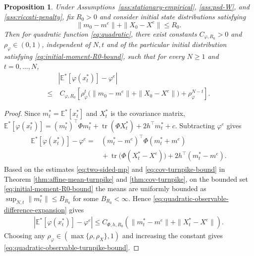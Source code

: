 \documentclass[10pt,journal,twoside]{IEEEtran}
\newtheorem{proposition}{Proposition}
\theoremstyle{definition}
\theoremstyle{remark}
\begin{document}
\begin{proposition}
	\label{prop:quadratic-observable-turnpike}
	Under Assumptions~\ref{ass:stationary-empirical}, \ref{ass:psd-W}, 
	and \ref{ass:riccati-penalty}, fix \(R_0>0\)
	and consider initial state distributions satisfying
	\begin{equation}
		\|m_0-m^e\|+\|X_0-X^e\|\le R_0 .
		\label{eq:initial-moment-R0-bound}
	\end{equation}
	Then for quadratic function \eqref{eq:quadratic}, there exist constants \(C_{\varphi,R_0}>0\)
	 and \(\rho_\varphi\in(0,1)\), independent of \(N,t\) and of
	the particular initial distribution satisfying \eqref{eq:initial-moment-R0-bound},
	such that for every \(N\ge 1\) and \(t=0,\ldots,N\),
	\begin{equation}
		\begin{aligned}
			&\left|
			\mathbb E^*[\varphi(x_t^*)]-\varphi^e
			\right|                                      \\
			\le&~
			C_{\varphi,R_0}
			\left[
			\rho_\varphi^t
			\big(
			\|m_0-m^e\|+\|X_0-X^e\|
			\big)
			+\rho_\varphi^{N-t}
			\right].
		\end{aligned}
		\label{eq:quadratic-observable-turnpike-bound}
	\end{equation}
\end{proposition}

\begin{proof}
	Since \(m_t^*=\mathbb E^*[x_t^*]\) and \(X_t^*\) is the
	covariance matrix,
	$\mathbb E^*[\varphi(x_t^*)]
			=
			(m_t^*)^\top \varPhi m_t^*
			+\operatorname{tr}(\varPhi X_t^*)
			+2h^\top m_t^*+c$.
	Subtracting $\varphi^e$ gives
	\begin{equation}
		\begin{aligned}
			\mathbb E^*[\varphi(x_t^*)]-\varphi^e
			={}&
			(m_t^*-m^e)^\top \varPhi (m_t^*+m^e)\\
			&\!\!\!\!\!\!\!\!\!\!+
			\operatorname{tr}\!\big(\varPhi (X_t^*-X^e)\big)
			+2h^\top(m_t^*-m^e).
		\end{aligned}
		\label{eq:quadratic-observable-difference-expansion}
	\end{equation}
	Based on the estimates \eqref{eq:two-sided-mp} and \eqref{eq:cov-turnpike-bound} in Theorem \ref{thm:affine-mean-turnpike} and \ref{thm:cov-turnpike},
	on the bounded set \eqref{eq:initial-moment-R0-bound} the means are
	uniformly bounded as
	\(
	\sup_{N,t}\|m_t^*\|\le B_{R_0}
	\)
	for some \(B_{R_0}<\infty\). Hence
	\eqref{eq:quadratic-observable-difference-expansion} gives
	\[
	\begin{aligned}
		\left|
		\mathbb E^*[\varphi(x_t^*)]-\varphi^e
		\right|        \le
		C_{\varPhi,h,R_0}
		\left(
		\|m_t^*-m^e\|
		+
		\|X_t^*-X^e\|
		\right).
	\end{aligned}
	\]
	Choosing any \(\rho_\varphi\in(\max\{\rho,\rho_X\},1)\) and increasing
	the constant gives \eqref{eq:quadratic-observable-turnpike-bound}.
\end{proof}
\end{document}
